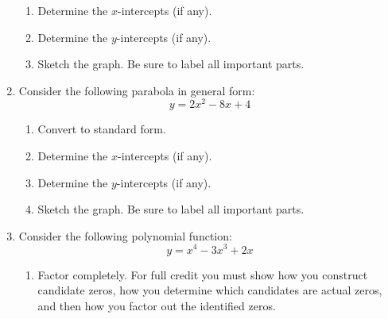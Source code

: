 \documentclass[letterpaper,12pt,fleqn]{article}
\begin{document}
\begin{enumerate}
\begin{enumerate}
  \item Determine the $x$-intercepts (if any).

    \vspace{1.5in}

  \item Determine the $y$-intercepts (if any).

    \vspace{1in}

  \item Sketch the graph. Be sure to label all important parts.
    
  \end{enumerate}

\item Consider the following parabola in general form:
  \[y=2x^2-8x+4\]
  \begin{enumerate}
  \item Convert to standard form.

    \vspace{2in}
    
  \item Determine the $x$-intercepts (if any).

    \vspace{1.5in}

  \item Determine the $y$-intercepts (if any).

    \vspace{0.5in}

  \item Sketch the graph. Be sure to label all important parts.

  \end{enumerate}

\item Consider the following polynomial function:
  \[y=x^4-3x^3+2x\]
  \begin{enumerate}
  \item Factor completely. For full credit you must show how you construct
    candidate zeros, how you determine which candidates are actual zeros, and
    then how you factor out the identified zeros.


\end{enumerate}
\end{enumerate}
\end{document}
